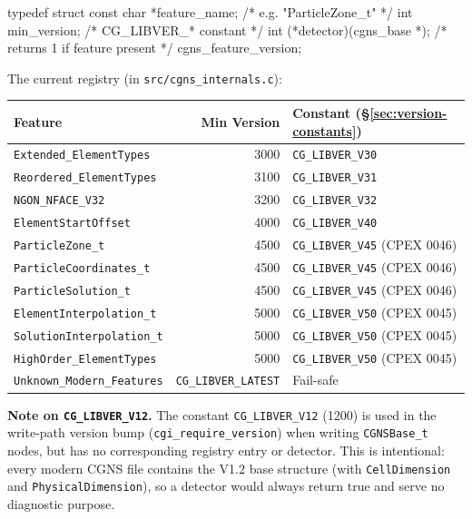 \documentclass[11pt,letterpaper]{article}
\makeatletter
\let\cgns@orig@lstlisting\lstlisting
\let\cgns@endorig@lstlisting\endlstlisting
\renewenvironment{lstlisting}
  {\par\needspace{5\baselineskip}\nolinenumbers\cgns@orig@lstlisting}
  {\cgns@endorig@lstlisting\par\linenumbers}
\makeatother
\begin{document}
\begin{lstlisting}[language=C]
typedef struct {
    const char *feature_name;     /* e.g. "ParticleZone_t" */
    int         min_version;      /* CG_LIBVER_* constant  */
    int (*detector)(cgns_base *); /* returns 1 if feature present */
} cgns_feature_version;
\end{lstlisting}

The current registry (in \texttt{src/cgns\_internals.c}):

\begin{center}
\begin{tabular}{l r l}
\toprule
\rowcolor{cgnsblue!15}
\textbf{Feature} & \textbf{Min Version} & \textbf{Constant (§\ref{sec:version-constants})} \\
\midrule
\texttt{Extended\_ElementTypes}       & 3000 & \texttt{CG\_LIBVER\_V30} \\
\texttt{Reordered\_ElementTypes}      & 3100 & \texttt{CG\_LIBVER\_V31} \\
\texttt{NGON\_NFACE\_V32}             & 3200 & \texttt{CG\_LIBVER\_V32} \\
\texttt{ElementStartOffset}           & 4000 & \texttt{CG\_LIBVER\_V40} \\
\texttt{ParticleZone\_t}              & 4500 & \texttt{CG\_LIBVER\_V45} (CPEX 0046) \\
\texttt{ParticleCoordinates\_t}       & 4500 & \texttt{CG\_LIBVER\_V45} (CPEX 0046) \\
\texttt{ParticleSolution\_t}          & 4500 & \texttt{CG\_LIBVER\_V45} (CPEX 0046) \\
\texttt{ElementInterpolation\_t}      & 5000 & \texttt{CG\_LIBVER\_V50} (CPEX 0045) \\
\texttt{SolutionInterpolation\_t}     & 5000 & \texttt{CG\_LIBVER\_V50} (CPEX 0045) \\
\texttt{HighOrder\_ElementTypes}      & 5000 & \texttt{CG\_LIBVER\_V50} (CPEX 0045) \\
\texttt{Unknown\_Modern\_Features} & \texttt{CG\_LIBVER\_LATEST} & Fail-safe \\
\bottomrule
\end{tabular}
\end{center}

\textbf{Note on \texttt{CG\_LIBVER\_V12}.}  The constant
\texttt{CG\_LIBVER\_V12} (1200) is used in the write-path version
bump (\texttt{cgi\_require\_version}) when writing
\texttt{CGNSBase\_t} nodes, but has no corresponding registry entry or
detector.  This is intentional: every modern CGNS file contains the
V1.2 base structure (with \texttt{CellDimension} and
\texttt{PhysicalDimension}), so a detector would always return true
and serve no diagnostic purpose.
\end{document}
